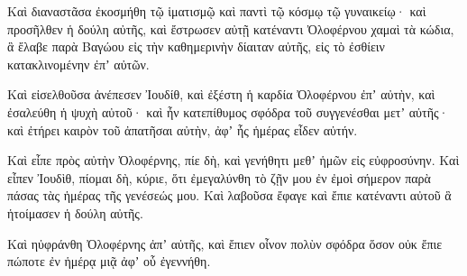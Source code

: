 {Καὶ διαναστᾶσα ἐκοσμήθη τῷ ἱματισμῷ καὶ παντὶ τῷ κόσμῳ τῷ γυναικείῳ· καὶ προσῆλθεν ἡ δούλη αὐτῆς, καὶ ἔστρωσεν αὐτῇ κατέναντι Ὀλοφέρνου χαμαὶ τὰ κώδια, ἃ ἔλαβε παρὰ Βαγώου εἰς τὴν καθημερινὴν δίαιταν αὐτῆς, εἰς τὸ ἐσθίειν κατακλινομένην ἐπʼ αὐτῶν.
\par }{\PP {}Καὶ εἰσελθοῦσα ἀνέπεσεν Ἰουδίθ, καὶ ἐξέστη ἡ καρδία Ὀλοφέρνου ἐπʼ αὐτὴν, καὶ ἐσαλεύθη ἡ ψυχὴ αὐτοῦ· καὶ ἦν κατεπίθυμος σφόδρα τοῦ συγγενέσθαι μετʼ αὐτῆς· καὶ ἐτήρει καιρὸν τοῦ ἀπατῆσαι αὐτὴν, ἀφʼ ἧς ἡμέρας εἶδεν αὐτήν.
\par }{\PP {}Καὶ εἶπε πρὸς αὐτὴν Ὀλοφέρνης, πίε δὴ, καὶ γενήθητι μεθʼ ἡμῶν εἰς εὐφροσύνην.
Καὶ εἶπεν Ἰουδὶθ, πίομαι δὴ, κύριε, ὅτι ἐμεγαλύνθη τὸ ζῇν μου ἐν ἐμοὶ σήμερον παρὰ πάσας τὰς ἡμέρας τῆς γενέσεώς μου.
Καὶ λαβοῦσα ἔφαγε καὶ ἔπιε κατέναντι αὐτοῦ ἃ ἡτοίμασεν ἡ δούλη αὐτῆς.
\par }{\PP {}Καὶ ηὐφράνθη Ὀλοφέρνης ἀπʼ αὐτῆς, καὶ ἔπιεν οἶνον πολὺν σφόδρα ὅσον οὐκ ἔπιε πώποτε ἐν ἡμέρᾳ μιᾷ ἀφʼ οὗ ἐγεννήθη.

}
